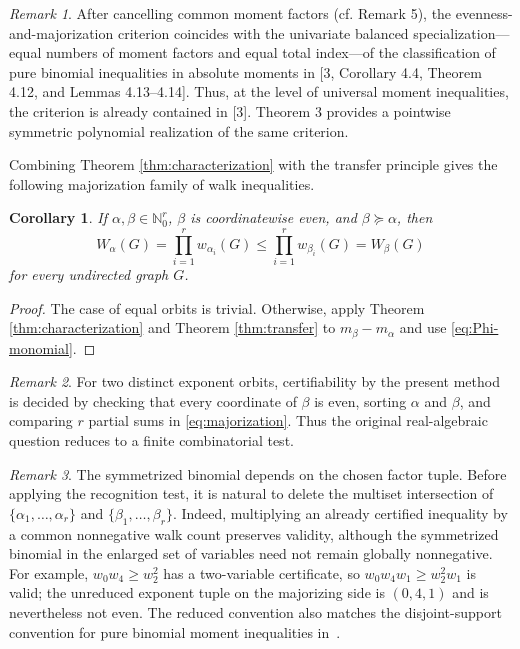 \documentclass[11pt]{article}
\newtheorem{corollary}[definition]{Corollary}
\newcommand{\Nat}{\mathbb{N}}
\theoremstyle{remark}
\newtheorem{remark}{Remark}
\begin{document}
\begin{remark}\label{rem:general-moments}
After cancelling common moment factors (cf. Remark 5), the evenness-and-majorization criterion coincides with the univariate balanced specialization—equal numbers of moment factors and equal total index—of the classification of pure binomial inequalities in absolute moments in [3, Corollary 4.4, Theorem 4.12, and Lemmas 4.13–4.14]. Thus, at the level of universal moment inequalities, the criterion is already contained in [3]. Theorem 3 provides a pointwise symmetric polynomial realization of the same criterion.
\end{remark}

Combining Theorem \ref{thm:characterization} with the transfer principle gives the following majorization family of walk inequalities.

\begin{corollary}\label{cor:majorization-walks}
If $\alpha,\beta\in\Nat_0^r$, $\beta$ is coordinatewise even, and
$\beta\succeq\alpha$, then
\begin{equation*}\label{eq:majorization-walks}
  W_\alpha(G)=\prod_{i=1}^r w_{\alpha_i}(G)
  \leq
  \prod_{i=1}^r w_{\beta_i}(G)=W_\beta(G)
\end{equation*}
for every undirected graph $G$.
\end{corollary}
\begin{proof}
The case of equal orbits is trivial. Otherwise, 
apply Theorem \ref{thm:characterization} and Theorem \ref{thm:transfer} to $m_\beta-m_\alpha$ and use \eqref{eq:Phi-monomial}.
\end{proof}

\begin{remark}
For two distinct exponent orbits, certifiability by the present method is decided by checking that every coordinate of $\beta$ is even, sorting $\alpha$ and $\beta$, and comparing $r$ partial sums in \eqref{eq:majorization}. 
Thus the original real-algebraic question reduces to a finite combinatorial test.
\end{remark}

\begin{remark}\label{rem:common-factors}
The symmetrized binomial depends on the chosen factor tuple.  Before applying the recognition test, it is natural to delete the multiset intersection of $\{\alpha_1,\ldots,\alpha_r\}$ and
$\{\beta_1,\ldots,\beta_r\}$.  
Indeed, multiplying an already certified inequality by a common nonnegative walk count preserves validity, although
the symmetrized binomial in the enlarged set of variables need not remain globally nonnegative.  For example, $w_0w_4\geq w_2^2$ has a two-variable certificate, so $w_0w_4w_1\geq w_2^2w_1$ is valid; the unreduced exponent tuple on the majorizing side is $(0,4,1)$ and is nevertheless not even.
The reduced convention also matches the disjoint-support convention for pure binomial moment inequalities in~\cite{blekherman-et-al-2025}.
\end{remark}
\end{document}
